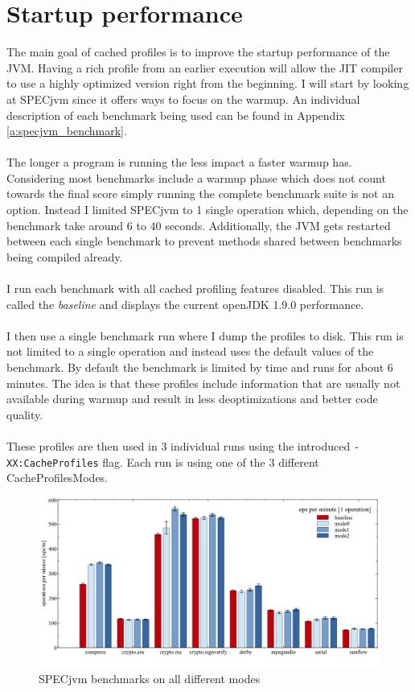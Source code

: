 \section{Startup performance}
\label{s:perf_general}
The main goal of cached profiles is to improve the startup performance of the JVM. Having a rich profile from an earlier execution will allow the JIT compiler to use a highly optimized version right from the beginning.
I will start by looking at SPECjvm since it offers ways to focus on the warmup. An individual description of each benchmark being used can be found in Appendix \ref{a:specjvm_benchmark}.
\\\\
The longer a program is running the less impact a faster warmup has. Considering most benchmarks include a warmup phase which does not count towards the final score simply running the complete benchmark suite is not an option.
Instead I limited SPECjvm to 1 single operation which, depending on the benchmark take around 6 to 40 seconds.
Additionally, the JVM gets restarted between each single benchmark to prevent methods shared between benchmarks being compiled already.
\\\\
I run each benchmark with all cached profiling features disabled. This run is called the \textit{baseline} and displays the current openJDK 1.9.0 performance.    
\\\\ 
I then use a single benchmark run where I dump the profiles to disk. This run is not limited to a single operation and instead uses the default values of the benchmark. By default the benchmark is limited by time and runs for about 6 minutes. The idea is that these profiles include information that are usually not available during warmup and result in less deoptimizations and better code quality.
\\\\
These profiles are then used in 3 individual runs using the introduced \texttt{-XX:CacheProfiles} flag. Each run is using one of the 3 different CacheProfilesModes.
\begin{figure}[ht]
  \begin{center}
    \centering
    \includegraphics[width=1.0\textwidth]{figures/others_warmup.png}
    \caption{SPECjvm benchmarks on all different modes}
    \label{f:others_warmup}
  \end{center}
\end{figure}
